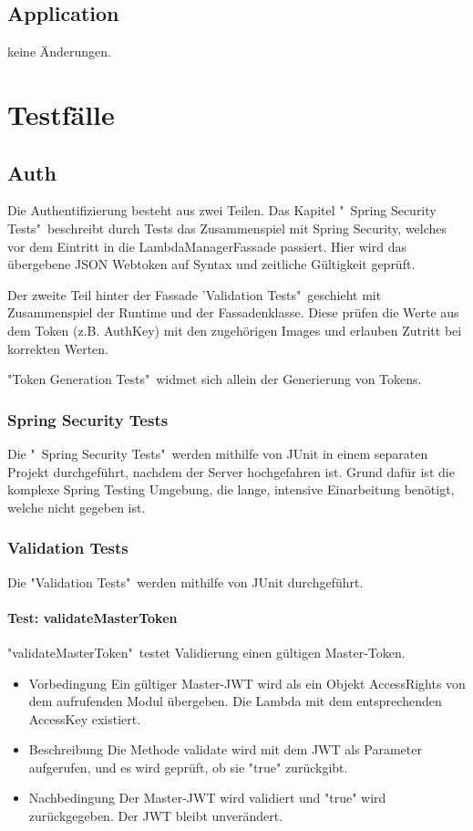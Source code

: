 \documentclass[a4paper,20pt,oneside]{book}
\begin{document}
	\section{Application}
	keine Änderungen.
	
	
\chapter{Testfälle}

\section{Auth}

Die Authentifizierung besteht aus zwei Teilen. Das Kapitel "\ Spring Security Tests"\  beschreibt durch Tests das Zusammenspiel mit Spring Security, welches vor dem Eintritt in die LambdaManagerFassade passiert. Hier wird das übergebene JSON Webtoken auf Syntax und zeitliche Gültigkeit geprüft. 

		Der zweite Teil hinter der Fassade 'Validation Tests"\ geschieht mit Zusammenspiel der Runtime und der Fassadenklasse. Diese prüfen die Werte aus dem Token (z.B. AuthKey) mit den zugehörigen Images und erlauben Zutritt bei korrekten Werten. 
		
		"Token Generation Tests"\  widmet sich allein der Generierung von Tokens.

\subsection{Spring Security Tests}
Die "\ Spring Security Tests"\ werden mithilfe von JUnit in einem separaten Projekt durchgeführt, nachdem der Server hochgefahren ist. Grund dafür ist die komplexe Spring Testing Umgebung, die lange, intensive Einarbeitung benötigt, welche nicht gegeben ist. 

\subsection{Validation Tests}
Die "Validation Tests"\ werden mithilfe von JUnit durchgeführt. 

\subsubsection{Test: validateMasterToken}
"validateMasterToken"\ testet Validierung einen gültigen Master-Token.

\begin{itemize}
\item Vorbedingung\linebreak
Ein gültiger Master-JWT wird als ein Objekt AccessRights von dem aufrufenden Modul übergeben. Die Lambda mit dem entsprechenden AccessKey existiert.
\item Beschreibung\linebreak
Die Methode validate wird mit dem JWT als Parameter aufgerufen, und es wird geprüft, ob sie "true" zurückgibt.
\item Nachbedingung\linebreak
Der  Master-JWT wird validiert und "true" wird zurückgegeben. Der JWT bleibt unverändert.
\end{itemize}
\end{document}
